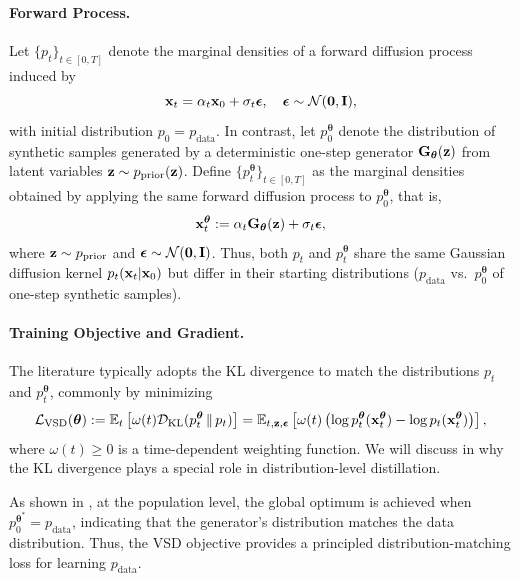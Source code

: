 \paragraph{Forward Process.}
Let $\{p_t\}_{t \in [0,T]}$ denote the marginal densities of a forward diffusion process induced by
\[
{\mathbf{x}}_t = \alpha_t {\mathbf{x}}_0 + \sigma_t \bm{\epsilon}, \quad \bm{\epsilon} \sim \mathcal{N}(\bm{0}, {\mathbf{I}}),
\]
with initial distribution $p_0 = p_{\mathrm{data}}$.  
In contrast, let $p_0^{\bm{\theta}}$ denote the distribution of synthetic samples generated by a deterministic one-step generator ${\mathbf{G}}_{\bm{\theta}}({\mathbf{z}})$ from latent variables ${\mathbf{z}} \sim p_{\mathrm{prior}}({\mathbf{z}})$. Define $\{p_t^{\bm{\theta}}\}_{t \in [0,T]}$ as the marginal densities obtained by applying the same forward diffusion process to $p_0^{\bm{\theta}}$, that is,
\begin{align}\label{eq:vsd-forward}
    {\mathbf{x}}_t^{\bm{\theta}} := \alpha_t {\mathbf{G}}_{\bm{\theta}}({\mathbf{z}}) + \sigma_t \bm{\epsilon}, 
\end{align}
where ${\mathbf{z}} \sim p_{\mathrm{prior}}$ and $ \bm{\epsilon} \sim \mathcal{N}(\bm{0}, {\mathbf{I}})$. Thus, both $p_t$ and $p_t^{\bm{\theta}}$ share the same Gaussian diffusion kernel 
$p_t({\mathbf{x}}_t| {\mathbf{x}}_0)$ but differ in their starting distributions 
($p_{\mathrm{data}}$ vs.\ $p_0^{\bm{\theta}}$ of one-step synthetic samples).

\paragraph{Training Objective and Gradient.}
The literature typically adopts the KL divergence to match the distributions $p_t$ and $p_t^{\bm{\theta}}$, commonly by minimizing
\begin{align*}
    \mathcal{L}_{\text{VSD}}(\bm{\theta}) :=\mathbb{E}_t \left[ \omega(t)  \mathcal{D}_{\text{KL}}(p_t^{\bm{\theta}} \, \| \, p_t) \right]
= \mathbb{E}_{t, {\mathbf{z}}, \bm{\epsilon}} \left[ \omega(t) \left( \log p_t^{\bm{\theta}}({\mathbf{x}}_t^{\bm{\theta}}) - \log p_t({\mathbf{x}}_t^{\bm{\theta}}) \right) \right],
\end{align*}
where $\omega(t)\geq 0$ is a time-dependent weighting function. We will discuss in  why the KL divergence plays a
special role in distribution-level distillation.



As shown in \citep{wang2023prolificdreamer}, at the population level, the global optimum is achieved when
$p_0^{\bm{\theta}^*}=p_{\mathrm{data}}$, indicating that the generator's distribution matches the data distribution. Thus, the VSD objective provides a principled distribution-matching loss for learning $p_{\mathrm{data}}$.

